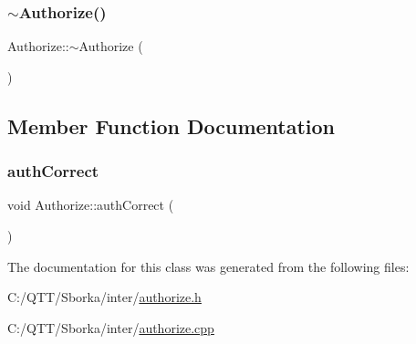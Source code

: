 \mbox{\label{class_authorize_a825194daace59ada42f80210f4a77eda}} 
\subsubsection{\texorpdfstring{$\sim$\+Authorize()}{~Authorize()}}
{\footnotesize\ttfamily Authorize\+::$\sim$\+Authorize (\begin{DoxyParamCaption}{ }\end{DoxyParamCaption})}



\subsection{Member Function Documentation}
\mbox{\label{class_authorize_a27ba7d2178c33c1fcf722cb7c054d210}} 
\subsubsection{\texorpdfstring{auth\+Correct}{authCorrect}}
{\footnotesize\ttfamily void Authorize\+::auth\+Correct (\begin{DoxyParamCaption}{ }\end{DoxyParamCaption})\hspace{0.3cm}{\ttfamily [signal]}}



The documentation for this class was generated from the following files\+:\begin{DoxyCompactItemize}
\item 
C\+:/\+Q\+T\+T/\+Sborka/inter/\mbox{\hyperlink{authorize_8h}{authorize.\+h}}\item 
C\+:/\+Q\+T\+T/\+Sborka/inter/\mbox{\hyperlink{authorize_8cpp}{authorize.\+cpp}}\end{DoxyCompactItemize}
